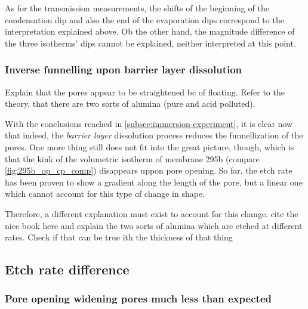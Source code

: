 \documentclass[../thesis.tex]{subfiles}
\begin{document}
              As for the transmission measurements, the shifts of the beginning of the condensation dip and also the end of the evaporation dips correspond to the interpretation explained above. Ob the other hand, the magnitude difference of the three isotherms' dips cannot be explained, neither interpreted at this point.

              


            \subsubsection{Inverse funnelling upon barrier layer dissolution}
            \label{subsec:pore-opening-effect}

              Explain that the pores appear to be straightened bc of floating. Refer to the theory, that there are two sorts of alumina (pure and acid  polluted).
              \medskip

              With the conclusions reached in \cref{subsec:immersion-experiment}, it is clear now that indeed, the \textit{barrier layer} dissolution process reduces the funnellization of the pores. One more thing still does not fit into the great picture, though, which is that the kink of the volumetric isotherm of membrane 295b (compare \cref{fig:295b_op_cp_comp}) disappears uppon pore opening. So far, the etch rate has been proven to show a gradient along the length of the pore, but a linear one which cannot account for this type of change in shape.

              Therefore, a different explanation must exist to account for this change. cite the nice book here and explain the two sorts of alumina which are etched at different rates. Check if that can be true ith the thickness of that thing


        \subsection{Etch rate difference}
        \label{subsec:etch-rate-difference}


          \subsubsection{Pore opening widening pores much less than expected}
          \label{subsec:pore-opening-pore-widening}
\end{document}
